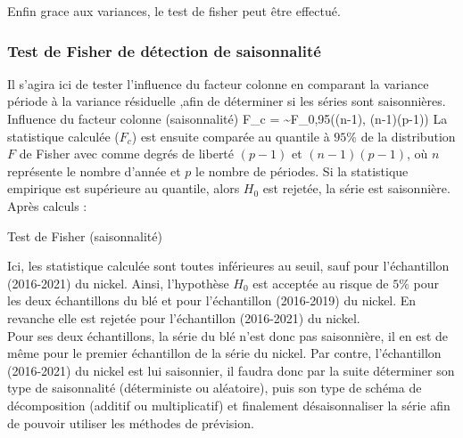 Enfin grace aux variances, le test de fisher peut être effectué.
\subsubsection*{Test de Fisher de détection de saisonnalité}
Il s'agira ici de tester l'influence du facteur colonne en comparant la variance période à la variance résiduelle ,afin de déterminer si les séries sont saisonnières.
    {Influence du facteur colonne (saisonnalité)}
    {F_{c} =  \sim F_{0,95}((n-1), (n-1)(p-1))}
La statistique calculée ($F_{c}$) est ensuite comparée au quantile à $95\%$ de la distribution $F$ de Fisher avec comme degrés de liberté $(p-1)$ et $(n-1)(p-1)$, où $n$ 
représente le nombre d'année et $p$ le nombre de périodes. Si la statistique empirique est supérieure au quantile, alors $ H_{0} $ est rejetée, la série est saisonnière. 
Après calculs :
\begin{table}[H]
    \centering
    \caption{Test de Fisher (saisonnalité)}
    \sffamily
    
\end{table}
Ici, les statistique calculée sont toutes inférieures au seuil, sauf pour l'échantillon (2016-2021)
du nickel.  Ainsi, l'hypothèse $H_{0}$ est acceptée au risque de $5\%$ pour les deux échantillons du blé
et pour l'échantillon (2016-2019) du nickel. En revanche elle est rejetée pour l'échantillon (2016-2021) du nickel.\\[11pt]
Pour ses deux échantillons, la série du blé n'est donc pas saisonnière, il en est de même pour le premier échantillon de la série du nickel. 
Par contre, l'échantillon (2016-2021) du nickel est lui saisonnier, il faudra donc par la suite 
déterminer son type de saisonnalité (déterministe ou aléatoire), puis son type de schéma de décomposition
(additif ou multiplicatif) et finalement désaisonnaliser la série afin de pouvoir utiliser les méthodes de prévision.
